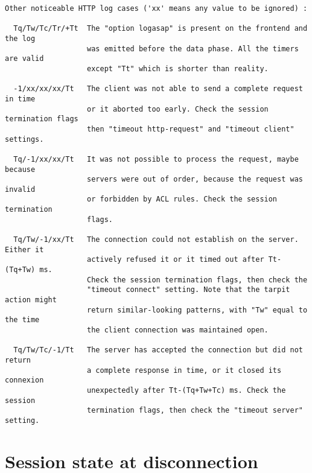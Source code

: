 \begin{verbatim}
Other noticeable HTTP log cases ('xx' means any value to be ignored) :

  Tq/Tw/Tc/Tr/+Tt  The "option logasap" is present on the frontend and the log
                   was emitted before the data phase. All the timers are valid
                   except "Tt" which is shorter than reality.

  -1/xx/xx/xx/Tt   The client was not able to send a complete request in time
                   or it aborted too early. Check the session termination flags
                   then "timeout http-request" and "timeout client" settings.

  Tq/-1/xx/xx/Tt   It was not possible to process the request, maybe because
                   servers were out of order, because the request was invalid
                   or forbidden by ACL rules. Check the session termination
                   flags.

  Tq/Tw/-1/xx/Tt   The connection could not establish on the server. Either it
                   actively refused it or it timed out after Tt-(Tq+Tw) ms.
                   Check the session termination flags, then check the
                   "timeout connect" setting. Note that the tarpit action might
                   return similar-looking patterns, with "Tw" equal to the time
                   the client connection was maintained open.

  Tq/Tw/Tc/-1/Tt   The server has accepted the connection but did not return
                   a complete response in time, or it closed its connexion
                   unexpectedly after Tt-(Tq+Tw+Tc) ms. Check the session
                   termination flags, then check the "timeout server" setting.
\end{verbatim}

\section{Session state at disconnection}

